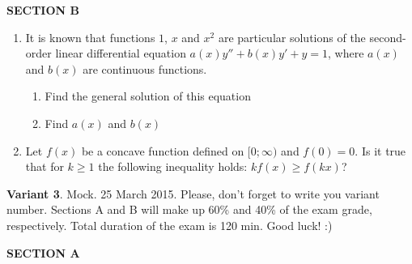 \documentclass[12pt,a4paper]{article}
\begin{document}
\textbf{SECTION B}

\begin{enumerate}[resume]

\item It is known that functions $1$, $x$ and $x^2$  are particular solutions of the second-order linear differential equation  $a(x)y''+b(x)y'+y=1$,  where $a(x)$  and $b(x)$  are continuous functions.
\begin{enumerate}
\item  Find the general solution of this equation
\item  Find $a(x)$ and  $b(x)$
\end{enumerate}
\item Let $f(x)$ be a concave function defined on $[0;\infty)$  and $f(0)=0$. Is it true that for $k \geq 1$ the following inequality holds: $kf(x)\geq f(kx)$?


\end{enumerate}
\newpage

\thispagestyle{empty}
\textbf{Variant 3}. Mock. 25 March 2015. Please, don't forget to write you variant number. Sections A and B will make up 60\% and 40\% of the exam grade, respectively. Total duration of the exam is 120 min. Good luck! :) 



\textbf{SECTION A}
\end{document}
